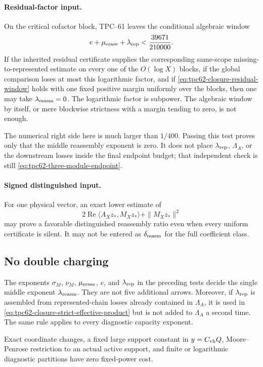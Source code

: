 \paragraph{Residual-factor input.}
On the critical cofactor block, TPC--61 leaves the conditional algebraic
window
\begin{equation}
 e+\mu_{\rm erase}+\lambda_{\rm rep}
 <\frac{39671}{210000}.
 \label{eq:tpc62-closure-residual-window}
\end{equation}
If the inherited residual certificate supplies the corresponding
same-scope missing-to-represented estimate on every one of the
\(O(\log X)\) blocks, if the global comparison loses at most this
logarithmic factor, and if
\eqref{eq:tpc62-closure-residual-window} holds with one fixed positive
margin uniformly over the blocks, then one may take
\(\lambda_{\rm reasm}=0\).  The logarithmic factor is subpower.  The
algebraic window by itself, or mere blockwise strictness with a margin
tending to zero, is not enough.

The numerical right side here is much larger than \(1/400\).  Passing this
test proves only that the middle reassembly exponent is zero.  It does not
place \(\lambda_{\rm rep}\), \(\Lambda_A\), or the downstream losses inside
the final endpoint budget; that independent check is still
\eqref{eq:tpc62-three-module-endpoint}.

\paragraph{Signed distinguished input.}
For one physical vector, an exact lower estimate of
\begin{equation}
 2\operatorname{Re}\langle A_Xz_*,M_Xz_*\rangle
 +\|M_Xz_*\|^2
 \label{eq:tpc62-closure-signed-input}
\end{equation}
may prove a favorable distinguished reassembly ratio even when every
uniform certificate is silent.  It may not be entered as
\(\delta_{\rm reasm}\) for the full coefficient class.

\subsection{No double charging}

The exponents \(\sigma_M\), \(\nu_M\),
\(\mu_{\rm erase}\), \(e\), and \(\lambda_{\rm rep}\) in the
preceding tests decide the single middle exponent
\(\lambda_{\rm reasm}\).  They are not five additional arrows.
Moreover, if \(\lambda_{\rm rep}\) is assembled from represented-chain
losses already contained in \(\Lambda_A\), it is used in
\eqref{eq:tpc62-closure-strict-effective-product} but is not added to
\(\Lambda_A\) a second time.  The same rule applies to every diagnostic
capacity exponent.

Exact coordinate changes, a fixed large support constant in
\(y=C_{\rm vh}Q\), Moore--Penrose restriction to an actual active support,
and finite or logarithmic diagnostic partitions have zero fixed-power cost.
